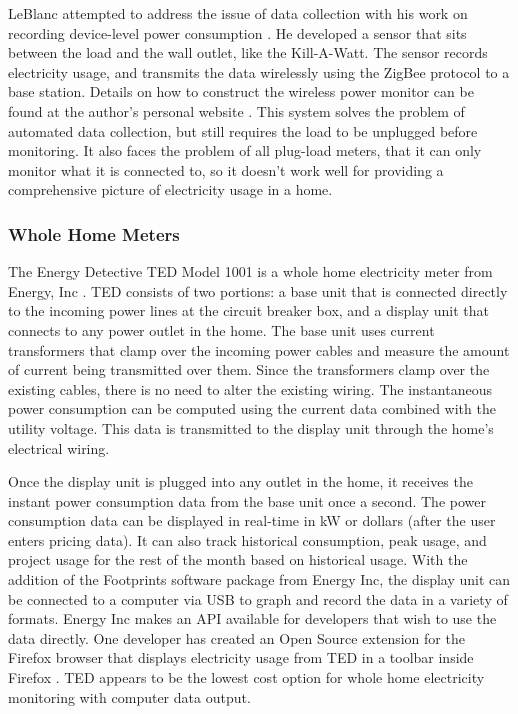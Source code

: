 LeBlanc attempted to address the issue of data collection with his work on recording device-level power consumption \cite{leblanc-2007}. He developed a sensor that sits between the load and the wall outlet, like the Kill-A-Watt. The sensor records electricity usage, and transmits the data wirelessly using the ZigBee protocol to a base station. Details on how to construct the wireless power monitor can be found at the author's personal website \cite{LeBlanc2008power-mon-howto}. This system solves the problem of automated data collection, but still requires the load to be unplugged before monitoring. It also faces the problem of all plug-load meters, that it can only monitor what it is connected to, so it doesn't work well for providing a comprehensive picture of electricity usage in a home.

\subsubsection{Whole Home Meters}
\label{whole-home-meters}

The Energy Detective TED Model 1001 is a whole home electricity meter from Energy, Inc \cite{the-energy-detective}. TED consists of two portions: a base unit that is connected directly to the incoming power lines at the circuit breaker box, and a display unit that connects to any power outlet in the home. The base unit uses current transformers that clamp over the incoming power cables and measure the amount of current being transmitted over them. Since the transformers clamp over the existing cables, there is no need to alter the existing wiring. The instantaneous power consumption can be computed using the current data combined with the utility voltage. This data is transmitted to the display unit through the home's electrical wiring.

Once the display unit is plugged into any outlet in the home, it receives the instant power consumption data from the base unit once a second. The power consumption data can be displayed in real-time in kW or dollars (after the user enters pricing data). It can also track historical consumption, peak usage, and project usage for the rest of the month based on historical usage. With the addition of the Footprints software package from Energy Inc, the display unit can be connected to a computer via USB to graph and record the data in a variety of formats. Energy Inc makes an API available for developers that wish to use the data directly. One developer has created an Open Source extension for the Firefox browser that displays electricity usage from TED in a toolbar inside Firefox \cite{Nick2008TED-the-Toolbar}. TED appears to be the lowest cost option for whole home electricity monitoring with computer data output.

